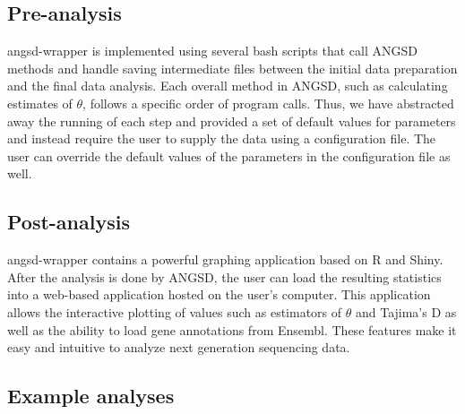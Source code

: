 \documentclass[12pt]{article}
\begin{document}
\subsection*{Pre-analysis}
angsd-wrapper is implemented using several bash scripts that call ANGSD methods and handle saving intermediate files between the initial data preparation and the final data analysis. 
Each overall method in ANGSD, such as calculating estimates of $\theta$, follows a specific order of program calls. 
Thus, we have abstracted away the running of each step and provided a set of default values for parameters and instead require the user to supply the data using a configuration file. 
The user can override the default values of the parameters in the configuration file as well. 

\subsection*{Post-analysis}
angsd-wrapper contains a powerful graphing application based on R and Shiny. %
After the analysis is done by ANGSD,  the user can load the resulting statistics into a web-based application hosted on the user's computer. 
This application allows the interactive plotting of values such as estimators of $\theta$ and Tajima's D as well as the ability to load gene annotations from Ensembl. 
These features make it easy and intuitive to analyze next generation sequencing data.


\subsection*{Example analyses}
\end{document}

